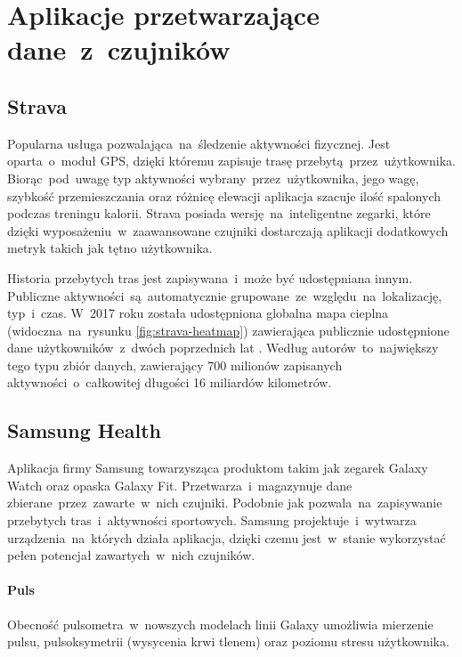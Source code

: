 \section{Aplikacje przetwarzające dane~z~czujników}

\subsection{Strava}
\label{sec:strava}
Popularna usługa pozwalająca~na~śledzenie aktywności fizycznej. Jest oparta~o~moduł GPS, dzięki któremu zapisuje trasę przebytą~przez~użytkownika. Biorąc~pod~uwagę typ aktywności wybrany~przez~użytkownika, jego wagę, szybkość przemieszczania oraz różnicę elewacji aplikacja szacuje ilość spalonych podczas treningu kalorii. Strava posiada wersję~na~inteligentne zegarki, które dzięki wyposażeniu~w~zaawansowane czujniki dostarczają aplikacji dodatkowych metryk takich jak tętno użytkownika. 

Historia przebytych tras jest zapisywana~i~może być udostępniana innym. Publiczne aktywności~są~automatycznie grupowane~ze~względu~na~lokalizację, typ~i~czas. W~2017 roku została udostępniona globalna mapa cieplna (widoczna~na~rysunku \ref{fig:strava-heatmap}) zawierająca publicznie udostępnione dane użytkowników~z~dwóch poprzednich lat \cite{Strava_Heatmap}. Według autorów~to~największy tego typu zbiór danych, zawierający 700 milionów zapisanych aktywności~o~całkowitej długości 16 miliardów kilometrów.

\bigskip
{}

\subsection{Samsung Health}
Aplikacja firmy Samsung towarzysząca produktom takim jak zegarek Galaxy Watch oraz opaska Galaxy Fit. Przetwarza~i~magazynuje dane zbierane~przez~zawarte~w~nich czujniki. Podobnie jak  pozwala~na~zapisywanie przebytych tras~i~aktywności sportowych. Samsung projektuje~i~wytwarza urządzenia~na~których działa aplikacja, dzięki czemu jest~w~stanie wykorzystać pełen potencjał zawartych~w~nich czujników.

\paragraph{Puls} Obecność pulsometra~w~nowszych modelach linii Galaxy umożliwia mierzenie pulsu, pulsoksymetrii (wysycenia krwi tlenem) oraz poziomu stresu użytkownika. 

